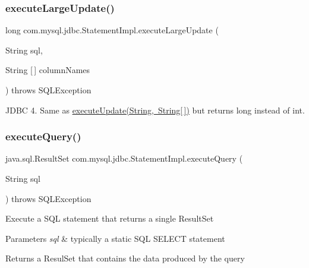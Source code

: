 \subsubsection{\texorpdfstring{execute\+Large\+Update()}{executeLargeUpdate()}\hspace{0.1cm}{\footnotesize\ttfamily [4/4]}}
{\footnotesize\ttfamily long com.\+mysql.\+jdbc.\+Statement\+Impl.\+execute\+Large\+Update (\begin{DoxyParamCaption}\item[{String}]{sql,  }\item[{String \mbox{[}$\,$\mbox{]}}]{column\+Names }\end{DoxyParamCaption}) throws S\+Q\+L\+Exception}

J\+D\+BC 4. Same as \mbox{\hyperlink{}{execute\+Update(\+String, String\mbox{[}$\,$\mbox{]})}} but returns long instead of int. \mbox{\label{classcom_1_1mysql_1_1jdbc_1_1_statement_impl_a0cec26f8a08e9d8e85b10565d4490b1a}} 
\subsubsection{\texorpdfstring{execute\+Query()}{executeQuery()}}
{\footnotesize\ttfamily java.\+sql.\+Result\+Set com.\+mysql.\+jdbc.\+Statement\+Impl.\+execute\+Query (\begin{DoxyParamCaption}\item[{String}]{sql }\end{DoxyParamCaption}) throws S\+Q\+L\+Exception}

Execute a S\+QL statement that returns a single Result\+Set


\begin{DoxyParams}{Parameters}
{\em sql} & typically a static S\+QL S\+E\+L\+E\+CT statement\\
\hline
\end{DoxyParams}
\begin{DoxyReturn}{Returns}
a Resul\+Set that contains the data produced by the query
\end{DoxyReturn}

